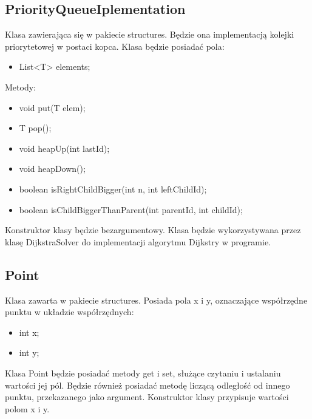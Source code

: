 \documentclass{article}
\begin{document}
    \subsection{PriorityQueueIplementation}
    Klasa zawierająca się w pakiecie structures. Będzie ona implementacją kolejki priorytetowej w postaci kopca. Klasa będzie posiadać pola:
    \begin{itemize}
        \item List<T> elements;
    \end{itemize}
    Metody:
    \begin{itemize}
        \item void put(T elem);
        \item  T pop();
        \item void heapUp(int lastId);
        \item void heapDown();
        \item boolean isRightChildBigger(int n, int leftChildId);
        \item boolean isChildBiggerThanParent(int parentId, int childId);
    \end{itemize}
    Konstruktor klasy będzie bezargumentowy. Klasa będzie wykorzystywana przez klasę DijkstraSolver do implementacji algorytmu Dijkstry w programie.

    \subsection{Point}
    Klasa zawarta w pakiecie structures. Posiada pola x i  y, oznaczające współrzędne punktu w układzie współrzędnych:
    \begin{itemize}
        \item int x;
        \item int y;
    \end{itemize}
    Klasa Point będzie posiadać metody get i set, służące czytaniu i ustalaniu wartości jej pól. Będzie również posiadać metodę liczącą odległość od innego punktu, przekazanego jako argument. Konstruktor klasy przypisuje wartości polom x i y.
\end{document}
